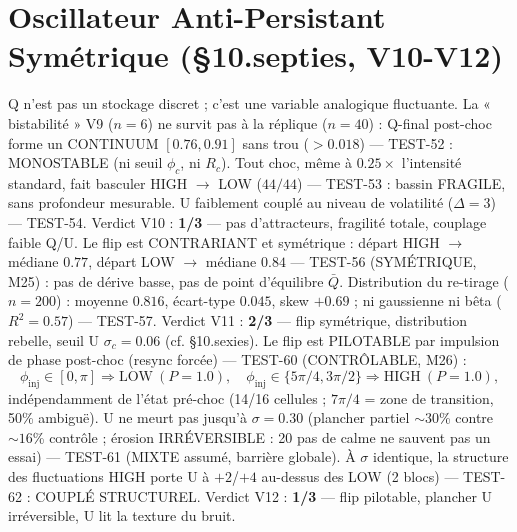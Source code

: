 \documentclass[11pt,a4paper]{article}
\begin{document}
\section{Oscillateur Anti-Persistant Symétrique (§10.septies, V10-V12)}
Q n'est pas un stockage discret ; c'est une variable analogique
fluctuante. La « bistabilité » V9 ($n = 6$) ne survit pas à la réplique
($n = 40$) : Q-final post-choc forme un CONTINUUM $[0.76, 0.91]$ sans
trou ($> 0.018$) --- TEST-52 : MONOSTABLE (ni seuil $\phi_c$, ni $R_c$).
Tout choc, même à $0.25\times$ l'intensité standard, fait basculer
HIGH $\to$ LOW ($44/44$) --- TEST-53 : bassin FRAGILE, sans profondeur
mesurable. U faiblement couplé au niveau de volatilité ($\Delta = 3$)
--- TEST-54.
Verdict V10 : \textbf{1/3} — pas d'attracteurs, fragilité totale,
couplage faible Q/U.
Le flip est CONTRARIANT et symétrique : départ HIGH $\to$ médiane
$0.77$, départ LOW $\to$ médiane $0.84$ --- TEST-56 (SYMÉTRIQUE, M25) :
pas de dérive basse, pas de point d'équilibre $\bar{Q}$. Distribution
du re-tirage ($n = 200$) : moyenne $0.816$, écart-type $0.045$, skew
$+0.69$ ; ni gaussienne ni bêta ($R^2 = 0.57$) --- TEST-57.
Verdict V11 : \textbf{2/3} — flip symétrique, distribution rebelle,
seuil U $\sigma_c = 0.06$ (cf. §10.sexies).
Le flip est PILOTABLE par impulsion de phase post-choc (resync forcée)
--- TEST-60 (CONTRÔLABLE, M26) : %
\begin{equation}
\phi_{\mathrm{inj}} \in [0, \pi] \Rightarrow \mathrm{LOW}\ (P = 1.0),
\quad \phi_{\mathrm{inj}} \in \{5\pi/4, 3\pi/2\} \Rightarrow \mathrm{HIGH}\
(P = 1.0),
\end{equation}
indépendamment de l'état pré-choc (14/16 cellules ; $7\pi/4$ = zone de
transition, 50\% ambiguë). U ne meurt pas jusqu'à $\sigma = 0.30$
(plancher partiel $\sim 30$\% contre $\sim 16$\% contrôle ; érosion
IRRÉVERSIBLE : 20 pas de calme ne sauvent pas un essai) --- TEST-61
(MIXTE assumé, barrière globale). À $\sigma$ identique, la structure
des fluctuations HIGH porte U à $+2$/$+4$ au-dessus des LOW (2 blocs)
--- TEST-62 : COUPLÉ STRUCTUREL.
Verdict V12 : \textbf{1/3} — flip pilotable, plancher U irréversible,
U lit la texture du bruit.
\end{document}
